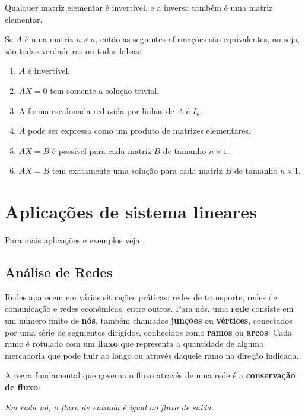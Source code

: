 \begin{teorema}
    Qualquer matriz elementar é invertível, e a inversa também é uma matriz elementar.
\end{teorema}

\begin{teorema}
    Se $A$ é uma matriz $n \times n$, então as seguintes afirmações são equivalentes, ou seja, são todas verdadeiras ou todas falsas:
    \begin{enumerate}[label={\roman*})]
        \item $A$ é invertível.
        \item $AX = 0$ tem somente a solução trivial.
        \item A forma escalonada reduzida por linhas de $A$ é $I_n$.
        \item $A$ pode ser expressa como um produto de matrizes elementares.
        \item $AX = B$ é possível para cada matriz $B$ de tamanho $n \times 1$.
        \item $AX = B$ tem exatamente uma solução para cada matriz $B$ de tamanho $n \times 1$.
    \end{enumerate}
\end{teorema}

\section{Aplicações de sistema lineares}

Para mais aplicações e exemplos veja \cite{Poole:2016,Anton:2012}.
\subsection{Análise de Redes}

Redes aparecem em várias situações práticas: redes de transporte, redes de comunicação e redes econômicas, entre outros. Para nós, uma \textbf{rede} consiste em um número finito de \textbf{nós}, também chamados \textbf{junções} ou \textbf{vértices}, conectados por uma série de segmentos dirigidos, conhecidos como \textbf{ramos} ou \textbf{arcos}. Cada ramo é rotulado com um \textbf{fluxo} que representa a quantidade de alguma mercadoria  que pode fluir ao longo ou através daquele ramo na direção indicada.

A regra fundamental que governa o fluxo através de uma rede é a \textbf{conservação de fluxo}:

\begin{tcolorbox}[colback=green!30, colframe=green!80!blue, title=Conservação de fluxo]
    \textit{Em cada nó, o fluxo de entrada é igual ao fluxo de saída.}
\end{tcolorbox}


